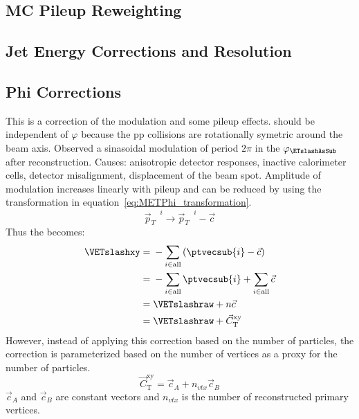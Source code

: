 \subsection{MC Pileup Reweighting}
\subsection{Jet Energy Corrections and Resolution}
\subsection{\VETslash Phi Corrections}
\label{sec:met_phi_corrections}
This is a correction of the \ETslash modulation and some pileup effects.
\VETslash should be independent of $\varphi$ because the pp collisions are rotationally symetric around the beam axis.
Observed a sinasoidal modulation of period $2\pi$ in the $\varphi_{\ETslashAsSub}$ after reconstruction.
Causes: anisotropic detector responses, inactive calorimeter cells, detector misalignment, displacement of the beam spot.
Amplitude of modulation increases linearly with pileup and can be reduced by using the transformation in equation~\ref{eq:METPhi_transformation}.
\begin{equation}
\label{eq:METPhi_transformation}
{\vec{p}_{T}}^{\text{ }i}\rightarrow{\vec{p}_{T}}^{\text{ }i}-\vec{c}
\end{equation}
Thus the \VETslash becomes:
\begin{equation}
    \label{eq:METPhi}
    \begin{aligned}
\VETslashxy={}&-\sum_{i \in \textrm{all}}\left(\ptvecsub{i}-\vec{c}\right) \\
={}&-\sum_{i \in \textrm{all}}\ptvecsub{i}+\sum_{i \in \textrm{all}}\vec{c} \\
={}&\VETslashraw+n\vec{c} \\
={}&\VETslashraw+{\vec C}_{\mathrm{T}}^{\mathrm{xy}}
    \end{aligned}
\end{equation}
However, instead of applying this correction based on the number of particles, the correction is parameterized based on the number of vertices as a proxy for the number of particles.
\begin{equation}
\label{eq:METPhi_correction}
{\vec C}_{\mathrm{T}}^{\mathrm{xy}}=\vec{c}_{A}+n_{vtx}\vec{c}_{B}
\end{equation}
$\vec{c}_{A}$ and $\vec{c}_{B}$ are constant vectors and $n_{vtx}$ is the number of reconstructed primary vertices.

